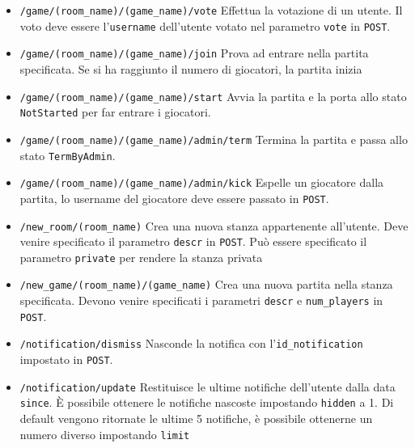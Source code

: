 \begin{itemize}[noitemsep,nolistsep]
	\item \texttt{/game/(room\_name)/(game\_name)/vote} Effettua la votazione di un utente. Il voto deve essere l'\texttt{username} dell'utente votato nel parametro \texttt{vote} in \texttt{POST}.
	
	\item \texttt{/game/(room\_name)/(game\_name)/join} Prova ad entrare nella partita specificata. Se si ha raggiunto il numero di giocatori, la partita inizia
	
	\item \texttt{/game/(room\_name)/(game\_name)/start} Avvia la partita e la porta allo stato \texttt{NotStarted} per far entrare i giocatori.
	
	\item \texttt{/game/(room\_name)/(game\_name)/admin/term} Termina la partita e passa allo stato \texttt{TermByAdmin}.
	
	\item \texttt{/game/(room\_name)/(game\_name)/admin/kick} Espelle un giocatore dalla partita, lo username del giocatore deve essere passato in \texttt{POST}.
	
	\item \texttt{/new\_room/(room\_name)} Crea una nuova stanza appartenente all'utente. Deve venire specificato il parametro \texttt{descr} in \texttt{POST}. Può essere specificato il parametro \texttt{private} per rendere la stanza privata
	
	\item \texttt{/new\_game/(room\_name)/(game\_name)} Crea una nuova partita nella stanza specificata. Devono venire specificati i parametri \texttt{descr} e \texttt{num\_players} in \texttt{POST}.
	
	\item \texttt{/notification/dismiss} Nasconde la notifica con l'\texttt{id\_notification} impostato in \texttt{POST}.
	
	\item \texttt{/notification/update} Restituisce le ultime notifiche dell'utente dalla data \texttt{since}. È possibile ottenere le notifiche nascoste impostando \texttt{hidden} a 1. Di default vengono ritornate le ultime 5 notifiche, è possibile ottenerne un numero diverso impostando \texttt{limit}
	
\end{itemize}